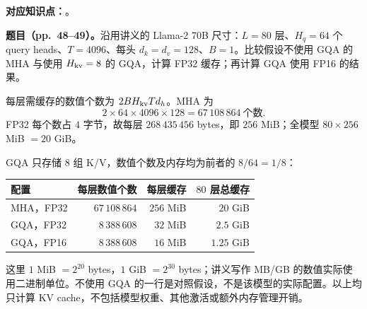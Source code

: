 
\textbf{对应知识点：}。

\textbf{题目（pp.~48--49）。}沿用讲义的 Llama-2 70B 尺寸：$L=80$ 层、$H_q=64$ 个 query heads、$T=4096$、每头 $d_k=d_v=128$、$B=1$。比较假设不使用 GQA 的 MHA 与使用 $H_{\rm kv}=8$ 的 GQA，计算 FP32 缓存；再计算 GQA 使用 FP16 的结果。

\begin{workedsolution}
每层需缓存的数值个数为 $2BH_{\rm kv}Td_h$。MHA 为
\[
 2\times64\times4096\times128=67\,108\,864\ \text{个数}.
\]
FP32 每个数占 $4$ 字节，故每层 $268\,435\,456$ bytes，即 $256$ MiB；全模型 $80\times256$ MiB $=20$ GiB。

GQA 只存储 $8$ 组 K/V，数值个数及内存均为前者的 $8/64=1/8$：
\begin{center}
\begin{tabular}{@{}lrrr@{}}
\toprule
配置 & 每层数值个数 & 每层缓存 & $80$ 层总缓存 \\
\midrule
MHA，FP32 & $67\,108\,864$ & $256$ MiB & $20$ GiB \\
GQA，FP32 & $8\,388\,608$ & $32$ MiB & $2.5$ GiB \\
GQA，FP16 & $8\,388\,608$ & $16$ MiB & $1.25$ GiB \\
\bottomrule
\end{tabular}
\end{center}
这里 $1$ MiB $=2^{20}$ bytes，$1$ GiB $=2^{30}$ bytes；讲义写作 MB/GB 的数值实际使用二进制单位。不使用 GQA 的一行是对照假设，不是该模型的实际配置。以上均只计算 KV cache，不包括模型权重、其他激活或额外内存管理开销。
\end{workedsolution}
